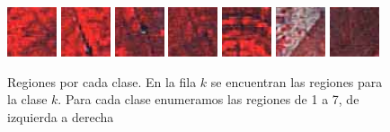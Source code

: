 \documentclass[a4paper,11pt]{article}
\begin{document}
\begin{figure}[h!]
\includegraphics[width=0.13\textwidth]{img/regiones/C4_50x50_01.png}
\includegraphics[width=0.13\textwidth]{img/regiones/C4_50x50_02.png}
\includegraphics[width=0.13\textwidth]{img/regiones/C4_50x50_03.png}
\includegraphics[width=0.13\textwidth]{img/regiones/C4_50x50_04.png}
\includegraphics[width=0.13\textwidth]{img/regiones/C4_50x50_05.png}
\includegraphics[width=0.13\textwidth]{img/regiones/C4_50x50_06.png}
\includegraphics[width=0.13\textwidth]{img/regiones/C4_50x50_07.png}
\caption{Regiones por cada clase. En la fila $k$ se encuentran las regiones para la clase $k$. Para cada clase enumeramos las regiones de 1 a 7, de izquierda a derecha}
\label{regiones}
\end{figure}
\end{document}
